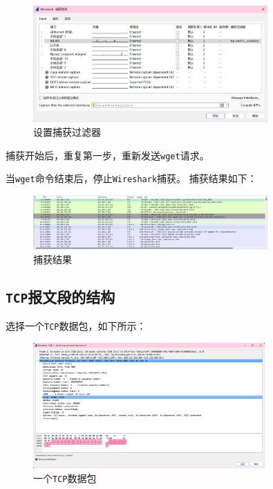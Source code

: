 \documentclass{article}
\begin{document}
\begin{figure}[H]
  \centering
  \includegraphics[width=0.8\textwidth]{img/2.png}
  \caption{设置捕获过滤器}
\end{figure}

捕获开始后，重复第一步，重新发送\texttt{wget}请求。

当\texttt{wget}命令结束后，停止\texttt{Wireshark}捕获。
捕获结果如下：

\begin{figure}[H]
  \centering
  \includegraphics[width=0.8\textwidth]{img/4.png}
  \caption{捕获结果}
\end{figure}


\subsection{\texttt{TCP}报文段的结构}

选择一个\texttt{TCP}数据包，如下所示：

\begin{figure}[H]
  \centering
  \includegraphics[width=0.79\textwidth]{img/5.png}
  \caption{一个\texttt{TCP}数据包}
\end{figure}
\end{document}
